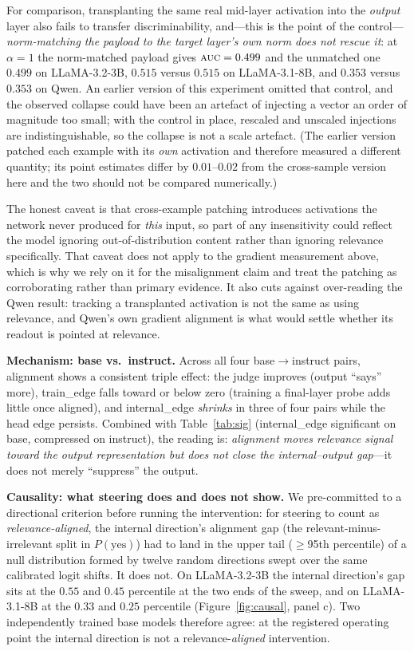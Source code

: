 \documentclass[11pt]{article}
\newcommand{\auc}{\textsc{auc}}
\begin{document}
For comparison, transplanting the same real mid-layer activation into the
\emph{output} layer also fails to transfer discriminability, and---this is the
point of the control---\emph{norm-matching the payload to the target layer's own
norm does not rescue it}: at $\alpha{=}1$ the norm-matched payload gives
$\auc=0.499$ and the unmatched one $0.499$ on LLaMA-3.2-3B, $0.515$ versus
$0.515$ on LLaMA-3.1-8B, and $0.353$ versus $0.353$ on Qwen. An earlier version
of this experiment omitted that control, and the observed collapse could have
been an artefact of injecting a vector an order of magnitude too small; with the
control in place, rescaled and unscaled injections are indistinguishable, so the
collapse is not a scale artefact. (The earlier version patched each example with
its \emph{own} activation and therefore measured a different quantity; its point
estimates differ by $0.01$--$0.02$ from the cross-sample version here and the two
should not be compared numerically.)

The honest caveat is that cross-example patching introduces activations the
network never produced for \emph{this} input, so part of any insensitivity could
reflect the model ignoring out-of-distribution content rather than ignoring
relevance specifically. That caveat does not apply to the gradient measurement
above, which is why we rely on it for the misalignment claim and treat the
patching as corroborating rather than primary evidence. It also cuts against
over-reading the Qwen result: tracking a transplanted activation is not the same
as using relevance, and Qwen's own gradient alignment is what would settle
whether its readout is pointed at relevance.

\textbf{Mechanism: base vs.\ instruct.}\label{sec:mech} Across all four base$\to$instruct pairs,
alignment shows a consistent triple effect: the judge improves (output
``says'' more), train\_edge falls toward or below zero (training a final-layer
probe adds little once aligned), and internal\_edge \emph{shrinks} in three of
four pairs while the head edge persists. Combined with
Table~\ref{tab:sig} (internal\_edge significant on base, compressed on
instruct), the reading is: \emph{alignment moves relevance signal toward the
output representation but does not close the internal--output gap}---it does
not merely ``suppress'' the output.

\textbf{Causality: what steering does and does not show.}
We pre-committed to a directional criterion before running the intervention: for
steering to count as \emph{relevance-aligned}, the internal direction's
alignment gap (the relevant-minus-irrelevant split in $P(\text{yes})$) had to
land in the upper tail ($\ge$95th percentile) of a null distribution formed by
twelve random directions swept over the same calibrated logit shifts. It does not. On LLaMA-3.2-3B the internal direction's gap sits at the $0.55$ and
$0.45$ percentile at the two ends of the sweep, and on LLaMA-3.1-8B at the
$0.33$ and $0.25$ percentile (Figure~\ref{fig:causal}, panel c). Two
independently trained base models therefore agree: at the registered operating
point the internal direction is not a relevance-\emph{aligned} intervention.
\end{document}
